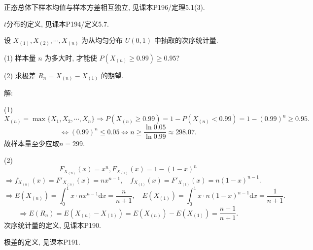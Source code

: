 \documentclass[standard]{ExBook}
\providecommand{\kaishu}{}
\renewcommand{\kaishu}{\CJKfamily{zhkai}}
\renewenvironment{shaded}{%
  \def\FrameCommand{\fboxsep=\FrameSep \colorbox{shadecolor}}%
  \MakeFramed{\advance\hsize-\width \FrameRestore}%
}{%
  \endMakeFramed
}
\begin{document}
\begin{qitems}
\textcolor{themeColor}{\selectfont {} 正态总体下样本均值与样本方差相互独立, 见课本P196/定理5.1(3).}

\textcolor{themeColor}{\selectfont {} $t$分布的定义, 见课本P194/定义5.7.}

\vspace{2.5cm-5em}

    \begin{bbox}
    \begin{shaded}
        \qitem
设 \( X_{(1)}, X_{(2)}, \cdots, X_{(n)} \) 为从均匀分布 \( U(0, 1) \) 中抽取的次序统计量.

(1) 样本量 \( n \) 为多大时, 才能使 \( P(X_{(n)} \geq 0.99) \geq 0.95 \)? 

(2) 求极差 \( R_n = X_{(n)} - X_{(1)} \) 的期望.
    \end{shaded}
    \end{bbox}

\vspace{\dimexpr2.5cm-5em\relax}

解:

(1) 
$$
X_{(n)}=\max\{X_1,X_2,\cdots,X_n\}
\Longrightarrow
P(X_{(n)}\geq0.99)=1-P(X_{(n)}<0.99)=1-(0.99)^n
\geq 0.95.
$$
$$
\Longleftrightarrow
(0.99)^n\leq0.05
\Longleftrightarrow
n\geq \frac{\ln0.05}{\ln0.99}\approx298.07.
$$
故样本量至少应取$n=299$.

(2) 
$$
F_{X_{(n)}}(x)=x^n, F_{X_{(1)}}(x)=1-(1-x)^n
$$
$$
\Longrightarrow
f_{X_{(n)}}(x)=F'_{X_{(n)}}(x)=nx^{n-1}, \quad f_{X_{(1)}}(x)=F'_{X_{(1)}}(x)=n(1-x)^{n-1}.
$$
$$
\Longrightarrow
E(X_{(n)})=\int_0^1 x\cdot nx^{n-1}\mathrm{d}x=\frac{n}{n+1},
\quad
E(X_{(1)})=\int_0^1 x\cdot n(1-x)^{n-1}\mathrm{d}x=\frac{1}{n+1}.
$$
$$
\Longrightarrow
E(R_n)=E(X_{(n)}-X_{(1)})=E(X_{(n)})-E(X_{(1)})=\frac{n-1}{n+1}.
$$
\textcolor{themeColor}{\selectfont {} 次序统计量的定义, 见课本P190.}

\textcolor{themeColor}{\selectfont {} 极差的定义, 见课本P191.}
\end{qitems}


\section{\kaishu{参数点估计}}
\end{document}
